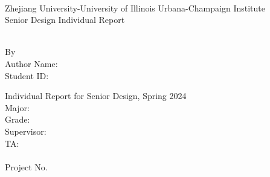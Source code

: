 \documentclass[../individual_thesis.tex]{subfiles}
\begin{document}
\begin{titlepage}
    \begin{center}
        ~~\\ %
        \vspace{1.5cm}
        {\fontsize{16}{24}\selectfont Zhejiang University-University of Illinois Urbana-Champaign Institute}\\
        \vspace{1.88cm}
        {\fontsize{28}{42}\selectfont Senior Design Individual Report}\\
        \vspace{1.6cm}
        \begin{minipage}{15.92cm}
            \centering
            \fontsize{26}{26}\selectfont
            \MakeUppercase{\bf \RPTTITLE}
        \end{minipage}\\[2cm]
        {\fontsize{14}{21}\selectfont By}\\[1.5em]
        {\fontsize{14}{21}\selectfont Author Name: \AUTHORNAME}\\
        {\fontsize{14}{21}\selectfont Student ID: \STUDENTID}

        \vfill
        {\fontsize{12}{\baselineskip}\selectfont Individual Report for Senior Design, Spring 2024\\
            Major: \MAJOR \\
            Grade: \GRADE \\
            Supervisor: \FACULTYNAME \\
            TA:~ \TANAME\\
            \vfill}
        {\fontsize{12}{18}\selectfont\RPTDATE\\
            Project No. \PROJNBR}
    \end{center}
    \vspace{2cm}
    ~
    \restoregeometry
\end{titlepage}
\thispagestyle{empty}
\end{document}
